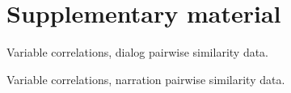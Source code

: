 \appendix

\section{Supplementary material}

\begin{table}
  \centering
  \begin{adjustbox}{angle=90}
    
  \end{adjustbox}
  \caption{Variable correlations, dialog pairwise similarity data.}
  \label{tab:dialogvarcor}
\end{table}
\begin{table}
  \centering
  \begin{adjustbox}{angle=90}
    
  \end{adjustbox}
  \caption{Variable correlations, narration pairwise similarity data.}
  \label{tab:narrationvarcor}
\end{table}

